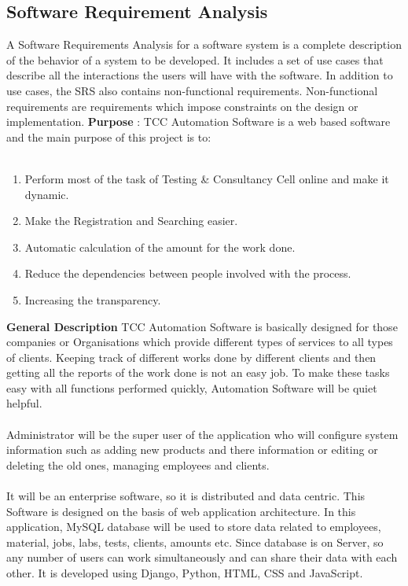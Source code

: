 \subsection{Software Requirement Analysis}
A Software Requirements Analysis for a software system is a complete description of the behavior of a system to be developed. It includes a set of use cases that describe all the interactions the users will have with the software. In addition to use cases, the SRS also contains non-functional requirements. Non-functional requirements are requirements which impose constraints on the design or implementation.
{\bf Purpose} : TCC Automation Software is a web based software and the main purpose of this project is to:\\\\
\begin{enumerate}
\item Perform most of the task of Testing \& Consultancy Cell online and make it dynamic.
\item Make the Registration and Searching easier.
\item Automatic calculation of the amount for the work done.
\item Reduce the dependencies between people involved with the process.
\item Increasing the transparency.
\end{enumerate}
\vskip 0.5cm
{\bf General Description}
TCC Automation Software is basically designed for those companies or Organisations which provide different types of services to all types of clients. Keeping track of different works done by different clients and then getting all the reports of the work done is not an easy job.
To make these tasks easy with all functions performed quickly, Automation Software will be quiet helpful.\\\\
Administrator will be the super user of the application who will configure system information such as adding new products and there information or editing or deleting the old ones, managing employees and clients.\\\\
It will be an enterprise software, so it is distributed and data centric. This Software is designed on the basis of web application architecture. In this application, MySQL database will be used to store data related to employees, material, jobs, labs, tests, clients, amounts etc. Since database is on Server, so any number of users can work simultaneously and can share their data with each other. It is developed using Django, Python, HTML, CSS and JavaScript.\\\\
